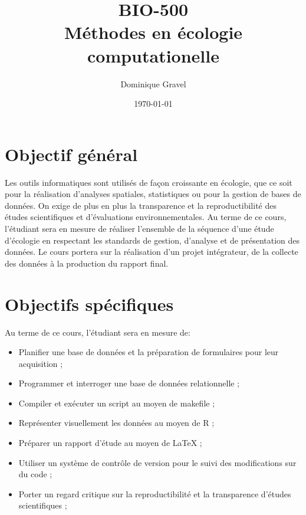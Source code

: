 \documentclass[12]{article}
\title{BIO-500 \\ Méthodes en écologie computationelle}
\date {\today}
\author {Dominique Gravel}
\affil {Département de biologie \\
Université de Sherbrooke \\ 
Local D8-3066 \\ 
819-821-8000 \#66589}
\affil {\url{dominique.gravel@usherbrooke.ca}}
\begin{document}
	\maketitle

	\section*{Objectif général}

	Les outils informatiques sont utilisés de façon croissante en écologie,
	que ce soit pour la réalisation d'analyses spatiales, statistiques ou pour
	la gestion de bases de données. On exige de plus en plus la transparence et
	la reproductibilité des études scientifiques et d'évaluations environnementales. 
	Au terme de ce cours, l'étudiant sera en mesure de réaliser l'ensemble de la 
	séquence d'une étude d'écologie en respectant les standards de gestion,  d'analyse et de présentation des données. Le cours portera sur la réalisation d'un projet intégrateur, de la collecte des données à la production du rapport final. 

	\section*{Objectifs spécifiques}

	Au terme de ce cours, l'étudiant sera en mesure de: 

	\begin{itemize}
	\renewcommand{\labelitemi}{$\bullet$}

	\item Planifier une base de données et la préparation de formulaires pour leur acquisition ; 

	\item Programmer et interroger une base de données relationnelle ;

	\item Compiler et exécuter un script au moyen de makefile ;

	\item Représenter visuellement les données au moyen de R ;

	\item Préparer un rapport d'étude au moyen de LaTeX ;

	\item Utiliser un système de contrôle de version pour le suivi des modifications sur du code ;

	\item Porter un regard critique sur la reproductibilité et la transparence d'études scientifiques ;

	\end{itemize}
\end{document}
